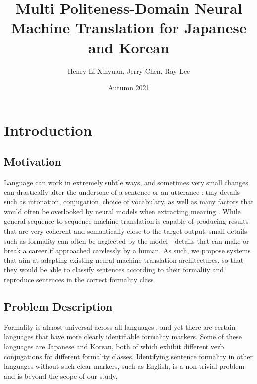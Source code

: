 \documentclass[11pt]{article}
\begin{document}
\title{Multi Politeness-Domain Neural Machine Translation for Japanese and Korean}

\author{Henry Li Xinyuan, Jerry Chen, Ray Lee}

\date{Autumn 2021}

\maketitle

\newpage

\section{Introduction}

\subsection{Motivation}

Language can work in extremely subtle ways, and sometimes very small changes can drastically alter the undertone of a sentence or an utterance \cite{Feely:19} \cite{niu-etal-2018-multi}: tiny details such as intonation, conjugation, choice of vocabulary, as well as many factors that would often be overlooked by neural models when extracting meaning \cite{pavlick-tetreault-2016-empirical}. While general sequence-to-sequence machine translation is capable of producing results that are very coherent and semantically close to the target output, small details such as formality can often be neglected by the model \cite{rao2018dear} - details that can make or break a career if approached carelessly by a human. As such, we propose systems that aim at adapting existing neural machine translation architectures, so that they would be able to classify sentences according to their formality and reproduce sentences in the correct formality class. 

\subsection{Problem Description}

Formality is almost universal across all languages \cite{article}, and yet there are certain languages that have more clearly identifiable formality markers. Some of these languages are Japanese and Korean, both of which exhibit different verb conjugations for different formality classes. Identifying sentence formality in other languages without such clear markers, such as English, is a non-trivial problem \cite{pavlick-tetreault-2016-empirical} and is beyond the scope of our study. 
\end{document}
